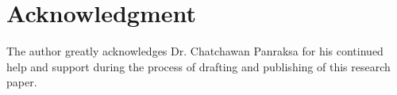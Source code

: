 \documentclass[preprint, 12pt]{elsarticle}
\numberwithin{equation}{section}
\theoremstyle{plain}
\theoremstyle{remark}
\begin{document}
\section*{Acknowledgment}

The author greatly acknowledges Dr. Chatchawan Panraksa for his continued help and support during the process of drafting and publishing of this research paper.




\nocite{*}


\end{document}
